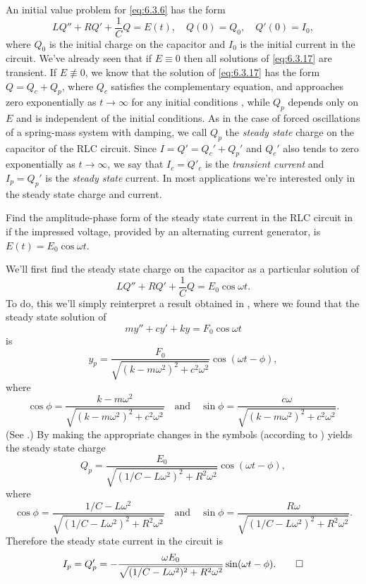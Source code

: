 An initial value problem for \eqref{eq:6.3.6}  has the form
\begin{equation} \label{eq:6.3.17}
 LQ''+RQ'+\frac{1}{C}Q=E(t),\quad Q(0)=Q_0,\quad Q'(0)=I_0,
\end{equation}
where $Q_0$ is the initial charge on the capacitor and $I_0$ is the
initial current in the circuit. We've already seen that if $E\equiv0$
then all solutions of \eqref{eq:6.3.17} are transient. If
$E\not\equiv0$, we know that the solution of \eqref{eq:6.3.17} has
the form $Q=Q_c+Q_p$, where $Q_c$ satisfies the complementary
equation, and approaches zero exponentially as $t\to\infty$ for any
initial conditions , while $Q_p$ depends only on $E$ and is
independent of the initial conditions. As in the case of forced
oscillations of a spring-mass system with damping, we call $Q_p$ the
\emph{\color{blue}steady state}
charge on the capacitor of the RLC circuit. Since
$I=Q'=Q_c'+Q_p'$ and $Q_c'$ also tends to zero exponentially as
$t\to\infty$, we say that $I_c=Q'_c$ is the \emph{\color{blue}transient current}
and $I_p=Q_p'$ is the \emph{\color{blue}steady state} current. In most
applications we're interested only in the steady state charge and
current.

\begin{example}\label{example:6.3.2}
Find the amplitude-phase form of the steady state current in the RLC
circuit in  if the impressed voltage, provided by
an alternating current generator, is $E(t)=E_0\cos\omega t$.
\end{example}

\begin{solution}
We'll first find the steady state charge on the capacitor as
a particular solution of
\[
LQ''+RQ'+\frac{1}{C}Q=E_0\cos\omega t.
\]
To do, this we'll simply reinterpret a result obtained in
, where we found that the steady state solution of
\[
my''+cy'+ky=F_0\cos\omega t
\]
is
\[
y_p=\frac{F_0}{\sqrt{(k-m\omega^2)^2+c^2\omega^2}}
\cos(\omega t-\phi),
\]
where
\[
\cos\phi=\frac{k-m\omega^2}{\sqrt
{(k-m\omega^2)^2+c^2\omega^2}}\quad\text{and}\quad 
\sin\phi=\frac{c\omega}{\sqrt{(k-m\omega^2)^2+c^2\omega^2}}.
\]
(See .) By making the
appropriate changes in the symbols
(according to ) yields the steady state charge
\[
Q_p=\frac{E_0}{\sqrt{(1/C-L\omega^2)^2+R^2\omega^2}}\cos(\omega
t-\phi),
\]
where
\[
\cos\phi=\frac{1/C-L\omega^2}{\sqrt{(1/C-L\omega^2)^2+R^2\omega^2}}
\quad\text{and}\quad 
\sin\phi=\frac{R\omega}{\sqrt{(1/C-L\omega^2)^2+R^2\omega^2}}.
\]
 Therefore the steady state current in the circuit
is
\[
I_p=Q_p'=
-\frac{\omega E_0}{\sqrt{(1/C-L\omega^2)^2+R^2\omega^2}}\sin(\omega
t-\phi).\qedhere
\]
\end{solution}

